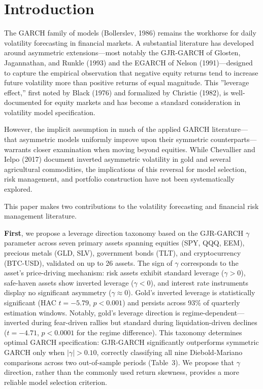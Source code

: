 

\section{Introduction}

The GARCH family of models (Bollerslev, 1986) remains the workhorse for daily volatility forecasting in financial markets. A substantial literature has developed around asymmetric extensions---most notably the GJR-GARCH of Glosten, Jagannathan, and Runkle (1993) and the EGARCH of Nelson (1991)---designed to capture the empirical observation that negative equity returns tend to increase future volatility more than positive returns of equal magnitude. This ''leverage effect,'' first noted by Black (1976) and formalized by Christie (1982), is well-documented for equity markets and has become a standard consideration in volatility model specification.

However, the implicit assumption in much of the applied GARCH literature---that asymmetric models uniformly improve upon their symmetric counterparts---warrants closer examination when moving beyond equities. While Chevallier and Ielpo (2017) document inverted asymmetric volatility in gold and several agricultural commodities, the implications of this reversal for model selection, risk management, and portfolio construction have not been systematically explored.

This paper makes two contributions to the volatility forecasting and financial risk management literature.

\textbf{First}, we propose a leverage direction taxonomy based on the GJR-GARCH $\gamma$ parameter across seven primary assets spanning equities (SPY, QQQ, EEM), precious metals (GLD, SLV), government bonds (TLT), and cryptocurrency (BTC-USD), validated on up to 26 assets. The sign of $\gamma$ corresponds to the asset's price-driving mechanism: risk assets exhibit standard leverage ($\gamma > 0$), safe-haven assets show inverted leverage ($\gamma < 0$), and interest rate instruments display no significant asymmetry ($\gamma \approx 0$). Gold's inverted leverage is statistically significant (HAC $t = -5.79$, $p < 0.001$) and persists across 93\% of quarterly estimation windows. Notably, gold's leverage direction is regime-dependent---inverted during fear-driven rallies but standard during liquidation-driven declines ($t = -4.71$, $p < 0.0001$ for the regime difference). This taxonomy determines optimal GARCH specification: GJR-GARCH significantly outperforms symmetric GARCH only when $|\gamma| > 0.10$, correctly classifying all nine Diebold-Mariano comparisons across two out-of-sample periods (Table~3). We propose that $\gamma$ direction, rather than the commonly used return skewness, provides a more reliable model selection criterion. %

